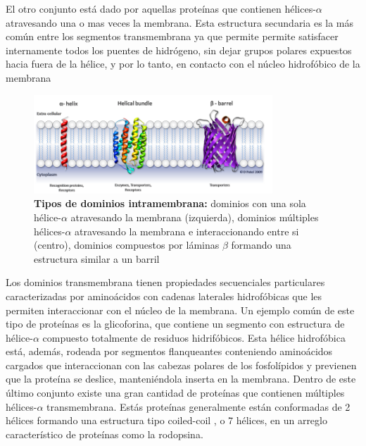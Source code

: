El otro conjunto está dado por aquellas proteínas que contienen hélices-$\alpha$ atravesando una o mas veces la membrana. 
Esta estructura secundaria es la más común entre los segmentos transmembrana ya que permite permite satisfacer internamente todos los puentes de hidrógeno, 
sin dejar grupos polares expuestos hacia fuera de la hélice, y por lo tanto, en contacto con el núcleo hidrofóbico de la membrana


\begin{figure}[h]
\centering
\includegraphics[width=0.8\textwidth]{img/proteinasMembrana.png} 
\caption{\textbf{Tipos de dominios intramembrana:} dominios con una sola hélice-$\alpha$ atravesando la membrana (izquierda), dominios múltiples hélices-$\alpha$ atravesando la membrana e interaccionando entre si (centro), 
dominios compuestos por láminas $\beta$ formando una estructura similar a un barril} 
\label{proteinasMembrana}
\end{figure}



Los dominios transmembrana tienen propiedades secuenciales particulares caracterizadas por aminoácidos con cadenas laterales hidrofóbicas que les permiten interaccionar con el núcleo de la membrana.
Un ejemplo común de este tipo de proteínas es la glicoforina, que contiene un segmento con estructura de hélice-$\alpha$ compuesto totalmente de residuos hidrifóbicos. 
Esta hélice hidrofóbica está, además, rodeada por segmentos flanqueantes conteniendo aminoácidos cargados que interaccionan con las cabezas polares de los fosfolípidos y previenen que la proteína se deslice,
manteniéndola inserta en la membrana.
Dentro de este último conjunto existe una gran cantidad de proteínas que contienen múltiples hélices-$\alpha$ transmembrana. Estás proteínas generalmente están conformadas de 2 hélices formando una estructura tipo coiled-coil
, o 7 hélices, en un arreglo característico de proteínas como la rodopsina.

